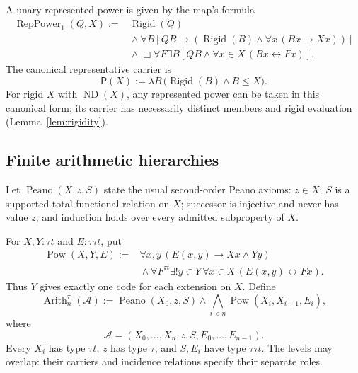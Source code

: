\documentclass[11pt,letterpaper,numbers=noenddot]{scrartcl}
\numberwithin{equation}{section}
\theoremstyle{definition}
\newcommand{\Rigid}{\operatorname{Rigid}}
\newcommand{\ND}{\operatorname{ND}}
\newcommand{\Rep}{\operatorname{RepPower}_1}
\newcommand{\Peano}{\operatorname{Peano}}
\newcommand{\Pow}{\operatorname{Pow}}
\newcommand{\Arith}{\operatorname{Arith}}
\newcommand{\PP}{\mathsf P}
\begin{document}
A unary represented power is given by the map's formula
\begin{equation}\label{eq:rep}
\begin{split}
\Rep(Q,X):={}&\Rigid(Q)\\
&{}\land\forall B\left[QB\to
  \left(\Rigid(B)\land\forall x\,(Bx\to Xx)\right)\right]\\
&{}\land\Box\forall F\exists B\left[
  QB\land\forall x\in X\,(Bx\leftrightarrow Fx)\right].
\end{split}
\end{equation}
The canonical representative carrier is
\begin{equation}\label{eq:canonical-power}
\PP(X):=\lambda B\,\bigl(\Rigid(B)\land B\le X\bigr).
\end{equation}
For rigid $X$ with $\ND(X)$, any represented power can be taken in this canonical form; its carrier has necessarily distinct members and rigid evaluation (Lemma~\ref{lem:rigidity}).

\subsection{Finite arithmetic hierarchies}

Let $\Peano(X,z,S)$ state the usual second-order Peano axioms: $z\in X$; $S$ is a supported total functional relation on $X$; successor is injective and never has value $z$; and induction holds over every admitted subproperty of $X$.

For $X,Y:\tau t$ and $E:\tau\tau t$, put
\begin{equation}\label{eq:pow}
\begin{split}
\Pow(X,Y,E):={}&
 \forall x,y\,(E(x,y)\to Xx\land Yy)\\
&{}\land\forall F^{\tau t}\exists!y\in Y\,
 \forall x\in X\,(E(x,y)\leftrightarrow Fx).
\end{split}
\end{equation}
Thus $Y$ gives exactly one code for each extension on $X$. Define
\begin{equation}\label{eq:arith}
\Arith_n^\tau(\mathcal A):=
\Peano(X_0,z,S)\land
\bigwedge_{i<n}\Pow(X_i,X_{i+1},E_i),
\end{equation}
where
\[
\mathcal A=(X_0,\ldots,X_n,z,S,E_0,\ldots,E_{n-1}).
\]
Every $X_i$ has type $\tau t$, $z$ has type $\tau$, and $S,E_i$ have type $\tau\tau t$. The levels may overlap: their carriers and incidence relations specify their separate roles.
\end{document}
